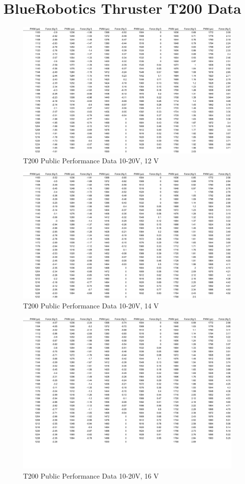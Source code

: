 \label{app:t200}

\chapter{BlueRobotics Thruster T200 Data}

\begin{figure}[H]
    \centering
    \includegraphics[width=.85\textwidth]{images/app-t200-12v.pdf}
    \caption{T200 Public Performance Data 10-20V, 12 V}
\end{figure}

\begin{figure}[H]
    \centering
    \includegraphics[width=.85\textwidth]{images/app-t200-14v.pdf}
    \caption{T200 Public Performance Data 10-20V, 14 V}
\end{figure}

\begin{figure}[H]
    \centering
    \includegraphics[width=.85\textwidth]{images/app-t200-16v.pdf}
    \caption{T200 Public Performance Data 10-20V, 16 V}
\end{figure}

